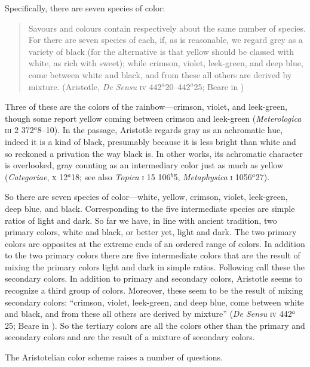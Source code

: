 Specifically, there are seven species of color:
\begin{quote}
	Savours and colours contain respectively about the same number of species. For there are seven species of each, if, as is reasonable, we regard grey as a variety of black (for the alternative is that yellow should be classed with white, as rich with sweet); while crimson, violet, leek-green, and deep blue, come between white and black, and from these all others are derived by mixture. (Aristotle, \emph{De Sensu} \textsc{iv} 442\( ^{a} \)20--442\( ^{a} \)25; Beare in \citealt[12]{Barnes:1984uq})
\end{quote}
Three of these are the colors of the rainbow---crimson, violet, and leek-green, though some report yellow coming between crimson and leek-green (\emph{Meterologica} \textsc{iii} 2 372\( ^{a} \)8--10). In the passage, Aristotle regards gray as an achromatic hue, indeed it is a kind of black, presumably because it is less bright than white and so reckoned a privation the way black is. In other works, its achromatic character is overlooked, gray counting as an intermediary color just as much as yellow (\emph{Categoriae}, \textsc{x} 12\( ^{a} \)18; see also \emph{Topica} \textsc{i} 15 106\( ^{b} \)5, \emph{Metaphysica} \textsc{i} 1056\( ^{a} \)27).

So there are seven species of color---white, yellow, crimson, violet, leek-green, deep blue, and black. Corresponding to the five intermediate species are simple ratios of light and dark. So far we have, in line with ancient tradition, two primary colors, white and black, or better yet, light and dark. The two primary colors are opposites at the extreme ends of an ordered range of colors. In addition to the two primary colors there are five intermediate colors that are the result of mixing the primary colors light and dark in simple ratios. Following \citet[297]{Sorabji:2022qf} call these the secondary colors. In addition to primary and secondary colors, Aristotle seems to recognize a third group of colors. Moreover, these seem to be the result of mixing secondary colors: ``crimson, violet, leek-green, and deep blue, come between white and black, and from these all others are derived by mixture'' (\emph{De Sensu} \textsc{iv} 442\( ^{a} \)25; Beare in \citealt[12]{Barnes:1984uq}). So the tertiary colors are all the colors other than the primary and secondary colors and are the result of a mixture of secondary colors. 

The Aristotelian color scheme raises a number of questions.

